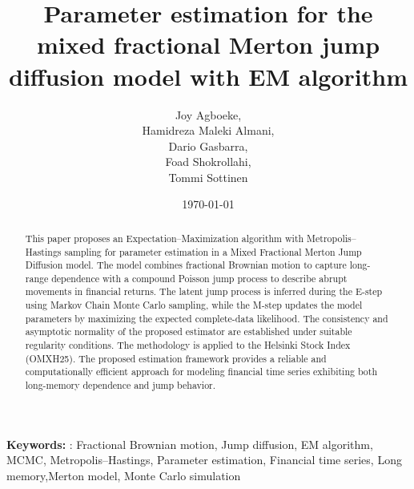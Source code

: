 \documentclass[a4paper,11pt]{amsart}
\theoremstyle{definition}
\theoremstyle{plain}
\theoremstyle{remark}
\newcommand{\1}{\mathbf{1}}
\newcommand{\Keywords}[1]{%
  \par\noindent\textbf{Keywords:} #1
}
\begin{document}
\vspace*{.5cm}

\title{Parameter estimation for the mixed fractional Merton jump diffusion model with EM algorithm}
%
\date{\today}
%
\author[
Agboeke, Almani, Gasbarra, Shokrollahi, and Sottinen
]{
Joy Agboeke, \\
Hamidreza Maleki Almani, \\
Dario Gasbarra, \\
Foad Shokrollahi, \\
Tommi Sottinen
}
\address{Department of Mathematics and Statistics,\\ School of Technology and Innovations, University of Vaasa,\\ P.O. Box 700, FIN-65101 Vaasa, FINLAND}

\begin{abstract}
This paper proposes an Expectation--Maximization algorithm with Metropolis--Hastings sampling for parameter estimation in a Mixed Fractional Merton Jump Diffusion model. The model combines fractional Brownian motion to capture long-range dependence with a compound Poisson jump process to describe abrupt movements in financial returns. The latent jump process is inferred during the E-step using Markov Chain Monte Carlo sampling, while the M-step updates the model parameters by maximizing the expected complete-data likelihood. The consistency and asymptotic normality of the proposed estimator are established under suitable regularity conditions. The methodology is applied to the Helsinki Stock Index (OMXH25). The proposed estimation framework provides a reliable and computationally efficient approach for modeling financial time series exhibiting both long-memory dependence and jump behavior.
\end{abstract}
\Keywords: {Fractional Brownian motion, Jump diffusion, EM algorithm, MCMC, Metropolis--Hastings, Parameter estimation, Financial time series, Long memory,Merton model, Monte Carlo simulation}


\maketitle

\vspace*{1cm}
\end{document}
